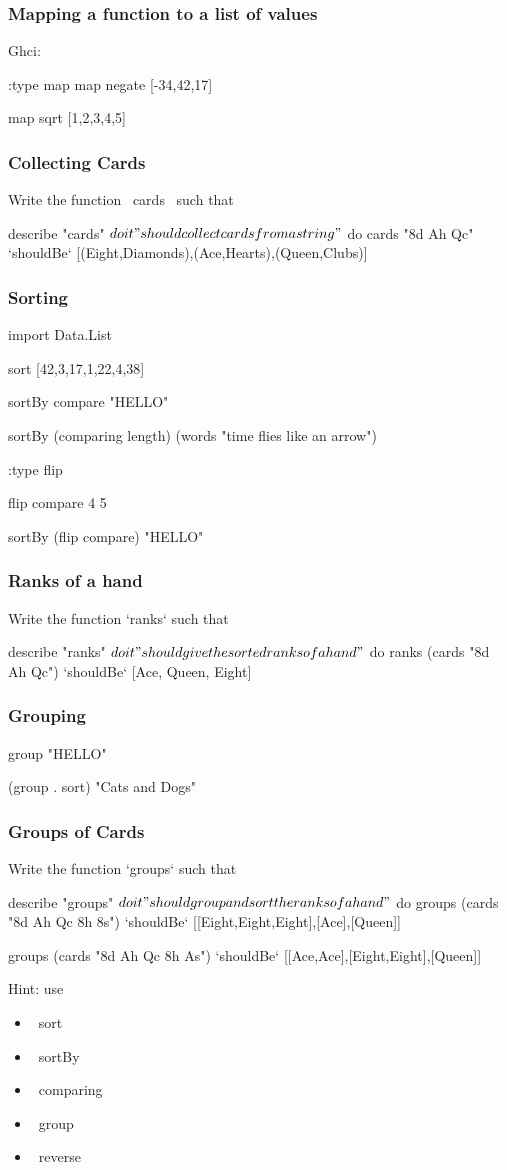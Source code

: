 \documentclass[11pt,xcolor={dvipsnames}]{beamer}
\newcommand{\tc}{\textcolor}
\newcommand{\key}[1]{\tc{orange}{#1}}
\newcommand{\rk}{\enskip{\key{$\hookleftarrow$}}}
\begin{document}
\begin{frame}[fragile]
\frametitle{Mapping a function to a list of values}
Ghci:
\begin{term}
:type map\rk
map negate [-34,42,17]\rk

map sqrt [1,2,3,4,5]\rk
\end{term}
\end{frame}
\begin{frame}[fragile]
\frametitle{Collecting Cards}
Write the function ~cards~ such that
\begin{hspec}
describe "cards" $ do
    it "should collect cards from a string" $ do
        cards "8d Ah Qc"  `shouldBe`
             [(Eight,Diamonds),(Ace,Hearts),(Queen,Clubs)]
\end{hspec}
\end{frame}
\begin{frame}[fragile]
\frametitle{Sorting}
\begin{term}
import Data.List\rk

sort [42,3,17,1,22,4,38]\rk

sortBy compare "HELLO"\rk

sortBy (comparing length) (words "time flies like an arrow")\rk

:type flip\rk

flip compare 4 5\rk

sortBy (flip compare) "HELLO"\rk
\end{term}
\end{frame}
\begin{frame}[fragile]
\frametitle{Ranks of a hand}
Write the function `ranks` such that
\begin{hspec}
describe "ranks" $ do
    it "should give the sorted ranks of a hand" $ do
        ranks (cards "8d Ah Qc")  `shouldBe` [Ace, Queen, Eight]
\end{hspec}
\end{frame}
\begin{frame}[fragile]
\frametitle{Grouping}
\begin{term}
group "HELLO"\rk
    
(group . sort) "Cats and Dogs"\rk
\end{term}
\end{frame}
\begin{frame}[fragile]
\frametitle{Groups of Cards}
Write the function `groups` such that
\begin{hspec}
describe "groups" $ do
    it "should group and sort the ranks of a hand" $ do
        groups (cards "8d Ah Qc 8h 8s")  `shouldBe`
             [[Eight,Eight,Eight],[Ace],[Queen]]

        groups (cards "8d Ah Qc 8h As")  `shouldBe`
             [[Ace,Ace],[Eight,Eight],[Queen]]
\end{hspec}
Hint: use
\begin{itemize}
\item  ~sort~
\item  ~sortBy~
\item  ~comparing~
\item  ~group~
\item  ~reverse~
\end{itemize}
\end{frame}
\end{document}
